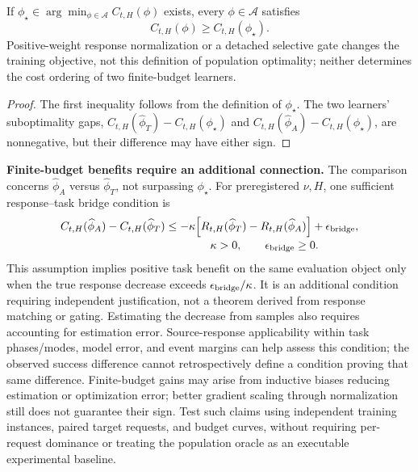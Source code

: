 \begin{proposition}
If $\phi_\star\in\arg\min_{\phi\in\mathcal A}C_{t,H}(\phi)$ exists, every
$\phi\in\mathcal A$ satisfies
\[
 C_{t,H}(\phi)\ge C_{t,H}(\phi_\star).
\]
Positive-weight response normalization or a detached selective gate changes the training objective, not this
definition of population optimality; neither determines the cost ordering of two finite-budget learners.
\end{proposition}
\begin{proof}
The first inequality follows from the definition of $\phi_\star$. The two learners' suboptimality gaps,
$C_{t,H}(\widehat\phi_T)-C_{t,H}(\phi_\star)$ and
$C_{t,H}(\widehat\phi_A)-C_{t,H}(\phi_\star)$, are nonnegative, but their difference may have either sign.
\end{proof}

\textbf{Finite-budget benefits require an additional connection.} The comparison concerns
$\widehat\phi_A$ versus $\widehat\phi_T$, not surpassing $\phi_\star$.
For preregistered $\nu,H$, one sufficient response--task bridge condition is
\begin{equation}
 \begin{split}
 C_{t,H}(\widehat\phi_A)-C_{t,H}(\widehat\phi_T)
 &\le -\kappa\!\left[R_{t,H}(\widehat\phi_T)
                    -R_{t,H}(\widehat\phi_A)\right]
       +\epsilon_{\rm bridge},\\[-0.2em]
 &\hspace{4em}\kappa>0,\qquad\epsilon_{\rm bridge}\ge0.
 \end{split}
 \label{eq:response-task-bridge}
\end{equation}
This assumption implies positive task benefit on the same evaluation object only when the true response decrease exceeds
$\epsilon_{\rm bridge}/\kappa$. It is an additional condition requiring independent justification, not a theorem derived from response
matching or gating. Estimating the decrease from samples also requires accounting for estimation error.
Source-response applicability within task phases/modes, model error, and event margins can help assess this
condition; the observed success difference cannot retrospectively define a condition proving that same difference.
Finite-budget gains may arise from inductive biases reducing estimation or optimization error; better gradient scaling through normalization
still does not guarantee their sign. Test such claims using independent training instances, paired target requests, and budget curves,
without requiring per-request dominance or treating the population oracle as an executable experimental baseline.

